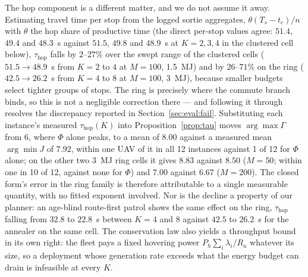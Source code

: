 \documentclass[journal,outdir=./]{IEEEtran}
\newcommand{\Ph}{P_{h}}
\newcommand{\Gam}{\Gamma}
\newcommand{\Ru}{R_u}
\begin{document}
The hop component is a different matter, and we do not assume it away. Estimating travel time per stop from the logged sortie aggregates, $\theta(T_s-t_c)/n$ with $\theta$ the hop share of productive time (the direct per-stop values agree: $51.4$, $49.4$ and $48.3$~s against $51.5$, $49.8$ and $48.9$~s at $K=2,3,4$ in the clustered cell below), $\tau_{\mathrm{hop}}$ falls by $2$--$27\%$ over the swept range of the clustered cells ($51.5\to48.9$~s from $K=2$ to $4$ at $M=100$, 1.5~MJ) and by $26$--$71\%$ on the ring ($42.5\to26.2$~s from $K=4$ to $8$ at $M=100$, 3~MJ), because smaller budgets select tighter groups of stops. The ring is precisely where the commute branch binds, so this is not a negligible correction there --- and following it through resolves the discrepancy reported in Section~\ref{sec:eval:fail}. Substituting each instance's measured $\tau_{\mathrm{hop}}(K)$ into Proposition~\ref{prop:tau} moves $\arg\max\Gam$ from $6$, where $\Phi$ alone peaks, to a mean of $8.00$ against a measured mean $\arg\min J$ of $7.92$, within one UAV of it in all 12 instances against 1 of 12 for $\Phi$ alone; on the other two 3~MJ ring cells it gives $8.83$ against $8.50$ ($M=50$; within one in 10 of 12, against none for $\Phi$) and $7.00$ against $6.67$ ($M=200$). The closed form's error in the ring family is therefore attributable to a single measurable quantity, with no fitted exponent involved. Nor is the decline a property of our planner: an age-blind route-first patrol shows the same effect on the ring, $\tau_{\mathrm{hop}}$ falling from $32.8$ to $22.8$~s between $K=4$ and $8$ against $42.5$ to $26.2$~s for the annealer on the same cell. The conservation law also yields a throughput bound in its own right: the fleet pays a fixed hovering power $\Ph\sum_i\lambda_i/\Ru$ whatever its size, so a deployment whose generation rate exceeds what the energy budget can drain is infeasible at every $K$.
\end{document}
